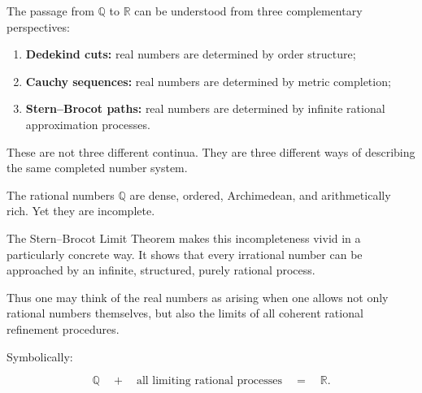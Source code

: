 \begin{remark}
The passage from $\mathbb{Q}$ to $\mathbb{R}$ can be understood from
three complementary perspectives:

\begin{enumerate}
\item \textbf{Dedekind cuts:} real numbers are determined by order
structure;
\item \textbf{Cauchy sequences:} real numbers are determined by metric
completion;
\item \textbf{Stern--Brocot paths:} real numbers are determined by
infinite rational approximation processes.
\end{enumerate}

These are not three different continua.  They are three different ways
of describing the same completed number system.
\end{remark}

\begin{remark}
The rational numbers $\mathbb{Q}$ are dense, ordered, Archimedean, and
arithmetically rich.  Yet they are incomplete.

The Stern--Brocot Limit Theorem makes this incompleteness vivid in a
particularly concrete way.  It shows that every irrational number can be
approached by an infinite, structured, purely rational process.

Thus one may think of the real numbers as arising when one allows not
only rational numbers themselves, but also the limits of all coherent
rational refinement procedures.

Symbolically:

\[
\mathbb{Q}
\quad+\quad
\text{all limiting rational processes}
\quad=\quad
\mathbb{R}.
\]

\end{remark}

